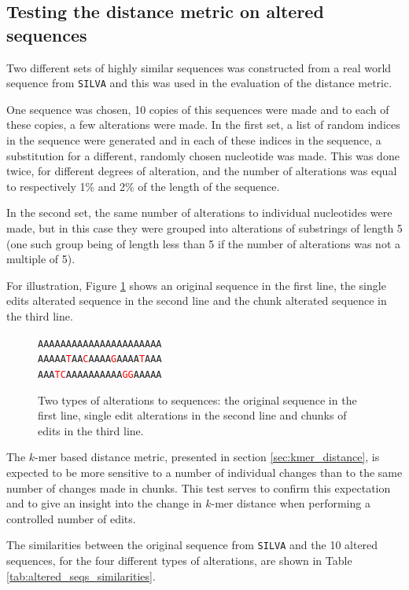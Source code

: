 \subsection{Testing the distance metric on altered sequences}
\label{sec:altered_sequences}

Two different sets of highly similar sequences was constructed from a real
world sequence from \texttt{SILVA} and this was used in the evaluation of the
distance metric.

One sequence was chosen, 10 copies of this sequences were made and to each of
these copies, a few alterations were made. In the first set, a list of random
indices in the sequence were generated and in each of these indices in the
sequence, a substitution for a different, randomly chosen nucleotide was made.
This was done twice, for different degrees of alteration, and the number of
alterations was equal to respectively 1\% and 2\% of the length of the
sequence.

In the second set, the same number of alterations to individual nucleotides
were made, but in this case they were grouped into alterations of substrings of
length 5 (one such group being of length less than 5 if the number of
alterations was not a multiple of 5).

For illustration, Figure \ref{fig:alterations} shows an original sequence in
the first line, the single edits alterated sequence in the second line and the
chunk alterated sequence in the third line.

\newcommand{\tc}[1]{\textcolor{red}{#1}}
\begin{figure}[H]
  \centering
  \texttt{AAAAAAAAAAAAAAAAAAAAAA} \\
  \texttt{AAAAA\tc{T}AA\tc{C}AAAA\tc{G}AAAA\tc{T}AAA} \\
  \texttt{AAA\tc{TC}AAAAAAAAAA\tc{GG}AAAAA}
  \caption{Two types of alterations to sequences: the original sequence in the
    first line, single edit alterations in the second line and chunks of edits
    in the third line.}
  \label{fig:alterations}
\end{figure}

The $k$-mer based distance metric, presented in section
\ref{sec:kmer_distance}, is expected to be more sensitive to a number of
individual changes than to the same number of changes made in chunks. This test
serves to confirm this expectation and to give an insight into the change in
$k$-mer distance when performing a controlled number of edits.

The similarities between the original sequence from \texttt{SILVA} and the 10
altered sequences, for the four different types of alterations, are shown in
Table \ref{tab:altered_seqs_similarities}.

